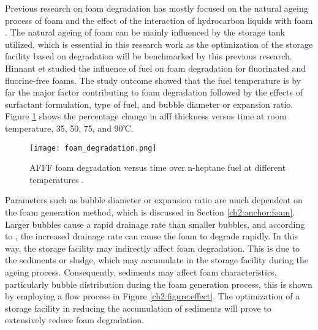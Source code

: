 Previous research on foam degradation has mostly focused on the natural ageing process of foam \cite{do2011numerical} and the effect of the interaction of hydrocarbon liquids with foam \cite{osei2015foam}.  The natural ageing of foam can be mainly influenced by the storage tank utilized, which is essential in this research work as the optimization of the storage facility based on degradation will be benchmarked by this previous research. Hinnant et \cite{hinnant2017influence} studied the influence of fuel on foam degradation for fluorinated and fluorine-free foams. The study outcome showed that the fuel temperature is by far the major factor contributing to foam degradation followed by the effects of surfactant formulation, type of fuel, and bubble diameter or expansion ratio. Figure \ref{ch2:figure:degradation} shows the percentage change in \acrshort{afff} thickness versus time at room temperature, 35, 50, 75, and 90℃.

\begin{figure}[H]
    \centering
    \texttt{[image: foam\_degradation.png]}
    \caption{AFFF foam degradation versus time over n-heptane fuel at different temperatures \cite{hinnant2017influence}.}
    \label{ch2:figure:degradation}
\end{figure}

Parameters such as bubble diameter or expansion ratio are much dependent on the foam generation method, which is discussed in Section \ref{ch2:anchor:foam}. Larger bubbles cause a rapid drainage rate than smaller bubbles, and according to \cite{hinnant2017influence}, the increased drainage rate can cause the foam to degrade rapidly. In this way, the storage facility may indirectly affect foam degradation. This is due to the sediments or sludge, which may accumulate in the storage facility during the ageing process. Consequently, sediments may affect foam characteristics, particularly bubble distribution during the foam generation process, this is shown by employing a flow process in Figure \ref{ch2:figure:effect}. The optimization of a storage facility in reducing the accumulation of sediments will prove to extensively reduce foam degradation.

